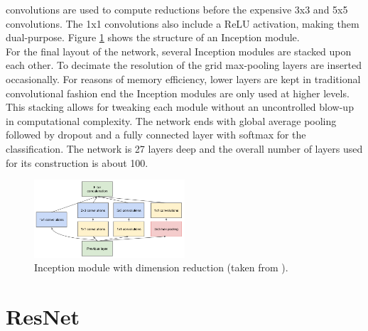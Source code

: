 \documentclass[11pt]{report}
\begin{document}
convolutions are used to compute reductions before the expensive 3x3 and 5x5
convolutions. The 1x1 convolutions also include a ReLU activation, making them
dual-purpose. Figure \ref{InceptionModule} shows the structure of an Inception
module. \\
For the final layout of the network, several Inception modules are stacked
upon each other. To decimate the resolution of the grid max-pooling layers are
inserted occasionally. For reasons of memory efficiency, lower layers are kept in
traditional convolutional fashion end the Inception modules are only used at
higher levels. This stacking allows for tweaking each module without an
uncontrolled blow-up in computational complexity. The network ends with global
average pooling followed by dropout and a fully connected layer with softmax for the
classification. The network is 27 layers deep and the overall number of layers
used for its construction is about 100.
\begin{figure}
  \centering
  \includegraphics[width=0.5\textwidth]{InceptionModule}
  \caption{Inception module with dimension reduction (taken from \cite{szegedy2015going}).}
  \label{InceptionModule}
\end{figure}

\section{ResNet}
\end{document}
